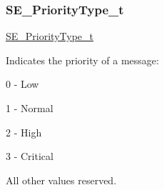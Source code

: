 \subsubsection{\texorpdfstring{S\+E\+\_\+\+Priority\+Type\+\_\+t}{SE\_PriorityType\_t}}
{\footnotesize\ttfamily \hyperlink{group__PriorityType_ga809c127a21bbe2efe64f393fa04be0c3}{S\+E\+\_\+\+Priority\+Type\+\_\+t}}

Indicates the priority of a message\+:

0 -\/ Low

1 -\/ Normal

2 -\/ High

3 -\/ Critical

All other values reserved. 
